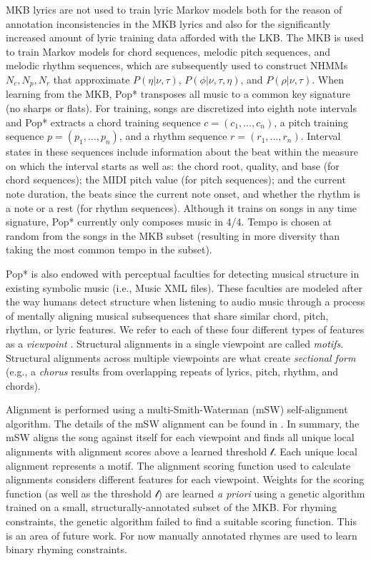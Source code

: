 \documentclass[phd,electronic,oneside,twosidetoc,letterpaper,chaptercenter,parttop,lol,lof,lot]{byumsphd}
\begin{document}
MKB lyrics are not used to train lyric Markov models both for the reason of annotation inconsistencies in the MKB lyrics and also for the significantly increased amount of lyric training data afforded with the LKB. The MKB is used to train Markov models for chord sequences, melodic pitch sequences, and melodic rhythm sequences, which are subsequently used to construct NHMMs $N_c, N_p, N_r$ that approximate $P(\eta|\nu,\tau)$, $P(\phi|\nu,\tau,\eta)$, and $P(\rho|\nu,\tau)$. When learning from the MKB, Pop* transposes all music to a common key signature (no sharps or flats). For training, songs are discretized into eighth note intervals and Pop* extracts a chord training sequence $c=(c_1,\dots,c_n)$, a pitch training sequence $p=(p_1,\dots,p_n)$, and a rhythm sequence $r=(r_1,\dots,r_n)$. Interval states in these sequences include information about the beat within the measure on which the interval starts as well as: the chord root, quality, and base (for chord sequences); the MIDI pitch value (for pitch sequences); and the current note duration, the beats since the current note onset, and whether the rhythm is a note or a rest (for rhythm sequences). Although it trains on songs in any time signature, Pop* currently only composes music in 4/4. Tempo is chosen at random from the songs in the MKB subset (resulting in more diversity than taking the most common tempo in the subset).

Pop* is also endowed with perceptual faculties for detecting musical structure in existing symbolic music (i.e., Music XML files). These faculties are modeled after the way humans detect structure when listening to audio music through a process of mentally aligning musical subsequences that share similar chord, pitch, rhythm, or lyric features. We refer to each of these four different types of features as a \textit{viewpoint} \citep{Witten1995}. Structural alignments in a single viewpoint are called \textit{motifs}. Structural alignments across multiple viewpoints are what create \textit{sectional form} (e.g., a \textit{chorus} results from overlapping repeats of lyrics, pitch, rhythm, and chords).

Alignment is performed using a multi-Smith-Waterman (mSW) self-alignment algorithm. The details of the mSW alignment can be found in \cite{bodily2018abstract}. In summary, the mSW aligns the song against itself for each viewpoint and finds all unique local alignments with alignment scores above a learned threshold $\mathcal{t}$. Each unique local alignment represents a motif. The alignment scoring function used to calculate alignments considers different features for each viewpoint. Weights for the scoring function (as well as the threshold $\mathcal{t}$) are learned \textit{a priori} using a genetic algorithm trained on a small, structurally-annotated subset of the MKB. For rhyming constraints, the genetic algorithm failed to find a suitable scoring function. This is an area of future work. For now manually annotated rhymes are used to learn binary rhyming constraints.
\end{document}
